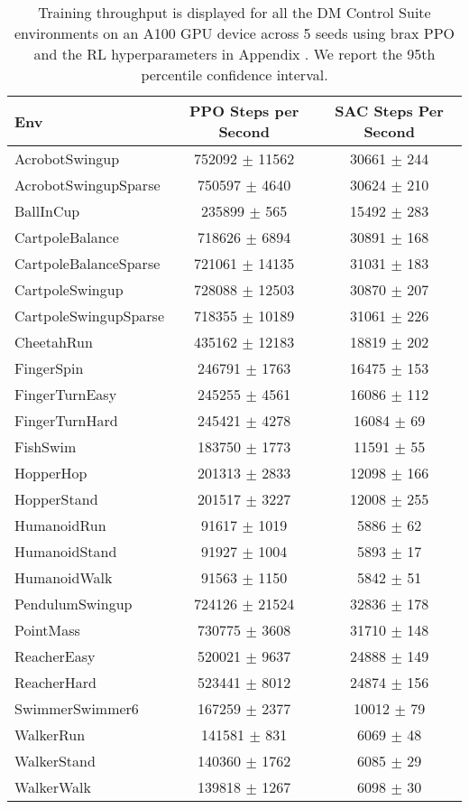 \begin{table*}[ht]
\centering
\begin{tabular}{|l|c|c|}
\hline 
 Env                   & PPO Steps per Second     & SAC Steps Per Second     \\
\hline 
 AcrobotSwingup        & 752092 $\pm$ 11562 & 30661 $\pm$ 244  \\
 AcrobotSwingupSparse  & 750597 $\pm$ 4640  & 30624 $\pm$ 210  \\
 BallInCup             & 235899 $\pm$ 565   & 15492 $\pm$ 283  \\
 CartpoleBalance       & 718626 $\pm$ 6894  & 30891 $\pm$ 168  \\
 CartpoleBalanceSparse & 721061 $\pm$ 14135 & 31031 $\pm$ 183  \\
 CartpoleSwingup       & 728088 $\pm$ 12503 & 30870 $\pm$ 207  \\
 CartpoleSwingupSparse & 718355 $\pm$ 10189 & 31061 $\pm$ 226  \\
 CheetahRun            & 435162 $\pm$ 12183 & 18819 $\pm$ 202  \\
 FingerSpin            & 246791 $\pm$ 1763  & 16475 $\pm$ 153  \\
 FingerTurnEasy        & 245255 $\pm$ 4561  & 16086 $\pm$ 112  \\
 FingerTurnHard        & 245421 $\pm$ 4278  & 16084 $\pm$ 69   \\
 FishSwim              & 183750 $\pm$ 1773  & 11591 $\pm$ 55   \\
 HopperHop             & 201313 $\pm$ 2833  & 12098 $\pm$ 166  \\
 HopperStand           & 201517 $\pm$ 3227  & 12008 $\pm$ 255  \\
 HumanoidRun           & 91617 $\pm$ 1019   & 5886 $\pm$ 62    \\
 HumanoidStand         & 91927 $\pm$ 1004   & 5893 $\pm$ 17    \\
 HumanoidWalk          & 91563 $\pm$ 1150   & 5842 $\pm$ 51    \\
 PendulumSwingup       & 724126 $\pm$ 21524 & 32836 $\pm$ 178  \\
 PointMass             & 730775 $\pm$ 3608  & 31710 $\pm$ 148  \\
 ReacherEasy           & 520021 $\pm$ 9637  & 24888 $\pm$ 149  \\
 ReacherHard           & 523441 $\pm$ 8012  & 24874 $\pm$ 156  \\
 SwimmerSwimmer6       & 167259 $\pm$ 2377  & 10012 $\pm$ 79   \\
 WalkerRun             & 141581 $\pm$ 831   & 6069 $\pm$ 48    \\
 WalkerStand           & 140360 $\pm$ 1762  & 6085 $\pm$ 29    \\
 WalkerWalk            & 139818 $\pm$ 1267  & 6098 $\pm$ 30    \\
\hline 
\end{tabular}
\caption{Training throughput is displayed for all the DM Control Suite environments on an A100 GPU device across 5 seeds using brax PPO and the RL hyperparameters in Appendix . We report the 95th percentile confidence interval.}
\label{tab:dm_control_env_training_throughput}
\end{table*}

\clearpage
